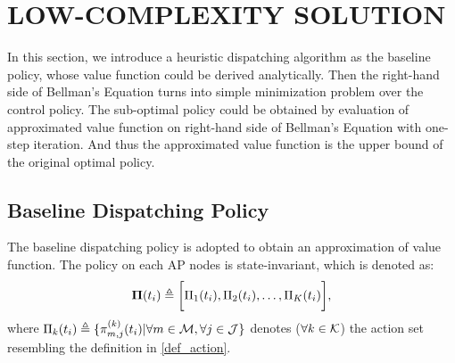 \section{LOW-COMPLEXITY SOLUTION}
In this section, we introduce a heuristic dispatching algorithm as the baseline policy, whose value function could be derived analytically.
Then the right-hand side of Bellman's Equation turns into simple minimization problem over the control policy. The sub-optimal policy could be obtained by evaluation of approximated value function on right-hand side of Bellman's Equation with one-step iteration. And thus the approximated value function is the upper bound of the original optimal policy.

\subsection{Baseline Dispatching Policy}
The baseline dispatching policy is adopted to obtain an approximation of value function. The policy on each AP nodes is state-invariant, which is denoted as:
\begin{align}
    \boldsymbol{\Pi}(t_i) \triangleq \bigg[\Pi_1(t_i), \Pi_2(t_i), \dots, \Pi_K(t_i)\bigg],
\end{align}
where $\Pi_k(t_i) \triangleq \{\pi^{(k)}_{m,j}(t_{i}) | \forall m\in\mathcal{M},\forall j\in\mathcal{J}\}$ denotes ($\forall k\in\mathcal{K}$) the action set resembling the definition in \ref{def_action}.

